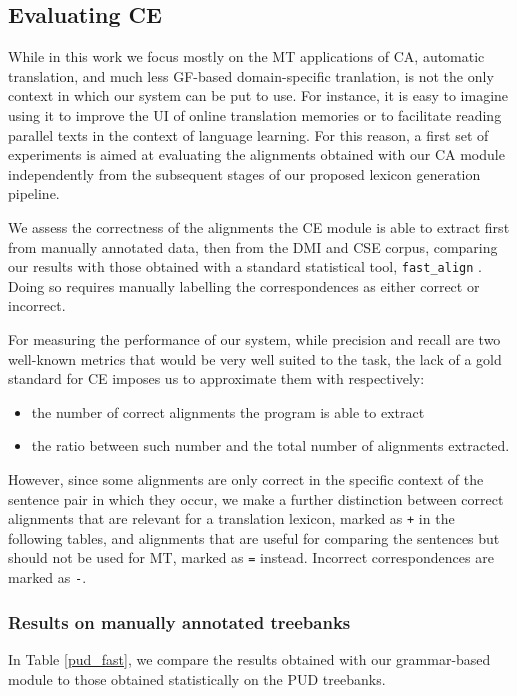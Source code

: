 \documentclass[11pt]{article}
\begin{document}

\subsection{Evaluating CE} %
While in this work we focus mostly on the MT applications of CA, automatic translation, and much less GF-based domain-specific tranlation, is not the only context in which our system can be put to use. 
For instance, it is easy to imagine using it to improve the UI of online translation memories or to facilitate reading parallel texts in the context of language learning.
For this reason, a first set of experiments is aimed at evaluating the alignments obtained with our CA module independently from the subsequent stages of our proposed lexicon generation pipeline.

We assess the correctness of the alignments the CE module is able to extract first from manually annotated data, then from the DMI and CSE corpus, comparing our results with those obtained with a standard statistical tool, \texttt{fast\_align} \cite{dummy}.
Doing so requires manually labelling the correspondences as either correct or incorrect. 

For measuring the performance of our system, while precision and recall are two well-known metrics that would be very well suited to the task, the lack of a gold standard for CE imposes us to approximate them with respectively:

\begin{itemize}
  \item the number of correct alignments the program is able to extract
  \item the ratio between such number and the total number of alignments extracted.
 \end{itemize}

However, since some alignments are only correct in the specific context of the sentence pair in which they occur, we make a further distinction between correct alignments that are relevant for a translation lexicon, marked as \texttt{+} in the following tables, and alignments that are useful for comparing the sentences but should not be used for MT, marked as \texttt{=} instead.  %
Incorrect correspondences are marked as \texttt{-}. 

\subsubsection{Results on manually annotated treebanks} 
In Table \ref{pud_fast}, we compare the results obtained with our grammar-based module to those obtained statistically on the PUD treebanks. 
\end{document}
